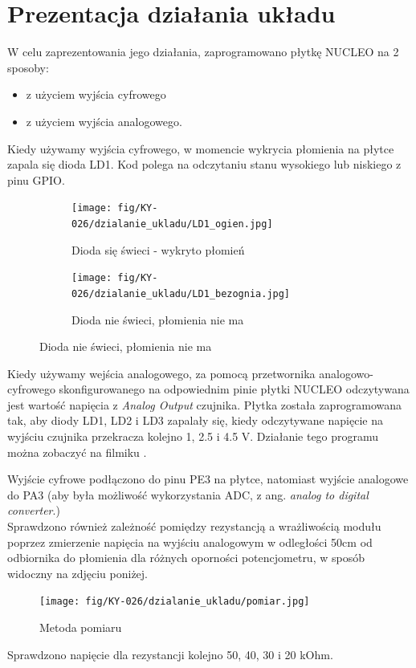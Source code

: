 \documentclass[11pt, a4paper]{article}
\begin{document}
\newpage

\section{Prezentacja działania układu}
W celu zaprezentowania jego działania, zaprogramowano płytkę NUCLEO na 2 sposoby:
\begin{itemize}
    \item z użyciem wyjścia cyfrowego
    \item z użyciem wyjścia analogowego.
\end{itemize}

Kiedy używamy wyjścia cyfrowego, w momencie wykrycia płomienia na płytce zapala się dioda LD1. Kod polega na odczytaniu stanu wysokiego lub niskiego z pinu GPIO.

\begin{figure}[h]
\centering
\begin{subfigure}{.4\textwidth}
  \centering
  \texttt{[image: fig/KY-026/dzialanie\_ukladu/LD1\_ogien.jpg]}
  \caption{Dioda się świeci - wykryto płomień}
  \label{fig:12pd}
\end{subfigure}
\begin{subfigure}{.4\textwidth}
  \centering
  \texttt{[image: fig/KY-026/dzialanie\_ukladu/LD1\_bezognia.jpg]}
  \caption{Dioda nie świeci, płomienia nie ma}
  \label{fig:sub2}
\end{subfigure}
\label{fig:12pu}
\end{figure}

Kiedy używamy wejścia analogowego, za pomocą przetwornika analogowo-cyfrowego skonfigurowanego na odpowiednim pinie płytki NUCLEO odczytywana jest wartość napięcia z \textit{Analog Output} czujnika. Płytka została zaprogramowana tak, aby diody LD1, LD2 i LD3 zapalały się, kiedy odczytywane napięcie na wyjściu czujnika przekracza kolejno 1, 2.5 i 4.5 V. Działanie tego programu można zobaczyć na filmiku \cite{a2}. 

Wyjście cyfrowe podłączono do pinu PE3 na płytce, natomiast wyjście analogowe do PA3 (aby była możliwość wykorzystania ADC, z ang. \textit{analog to digital converter}.)\\

Sprawdzono również zależność pomiędzy rezystancją a wrażliwością modułu poprzez zmierzenie napięcia na wyjściu analogowym w odległości 50cm od odbiornika do płomienia dla różnych oporności potencjometru, w sposób widoczny na zdjęciu poniżej. 

\vspace{0.5cm}
\begin{figure}[h]
  \centering
  \texttt{[image: fig/KY-026/dzialanie\_ukladu/pomiar.jpg]}
    \caption{Metoda pomiaru}
    \label{sch}
\end{figure}
Sprawdzono napięcie dla rezystancji kolejno 50, 40, 30 i 20 kOhm. 
\end{document}
